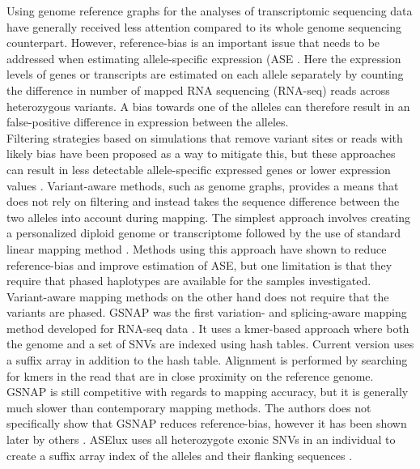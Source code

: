 Using genome reference graphs for the analyses of transcriptomic sequencing data have generally received less attention compared to its whole genome sequencing counterpart.
However, reference-bias is an important issue that needs to be addressed when estimating allele-specific expression (ASE \cite{Degner2009-vw,Castel2015-ef}.
Here the expression levels of genes or transcripts are estimated on each allele separately by counting the difference in number of mapped RNA sequencing (RNA-seq) reads across heterozygous variants.
A bias towards one of the alleles can therefore result in an false-positive difference in expression between the alleles. \\

Filtering strategies based on simulations that remove variant sites or reads with likely bias have been proposed as a way to mitigate this, but these approaches can result in less detectable allele-specific expressed genes or lower expression values \cite{Castel2015-ef,Van_de_Geijn2015-dz}. 
Variant-aware methods, such as genome graphs, provides a means that does not rely on filtering and instead takes the sequence difference between the two alleles into account during mapping.
The simplest approach involves creating a personalized diploid genome or transcriptome followed by the use of standard linear mapping method \cite{Turro2011-op,Rozowsky_2011,Bray_2016,Raghupathy2018-sd}.
Methods using this approach have shown to reduce reference-bias and improve estimation of ASE, but one limitation is that they require that phased haplotypes are available for the samples investigated.
Variant-aware mapping methods on the other hand does not require that the variants are phased.
GSNAP was the first variation- and splicing-aware mapping method developed for RNA-seq data \cite{Wu2010-hv}.
It uses a kmer-based approach where both the genome and a set of SNVs are indexed using hash tables. %
Current version uses a suffix array in addition to the hash table.
Alignment is performed by searching for kmers in the read that are in close proximity on the reference genome. %
GSNAP is still competitive with regards to mapping accuracy, but it is generally much slower than contemporary mapping methods.
The authors does not specifically show that GSNAP reduces reference-bias, however it has been shown later by others \cite{Castel2015-ef}.
ASElux uses all heterozygote exonic SNVs in an individual to create a suffix array index of the alleles and their flanking sequences \cite{Miao2018-ps}. 
